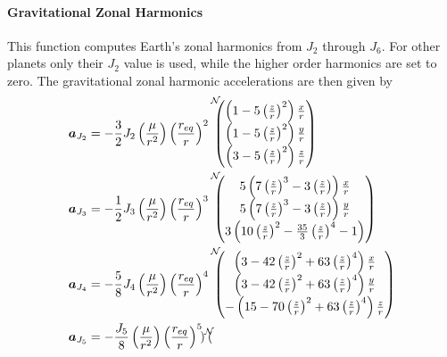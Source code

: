 \paragraph{Gravitational Zonal Harmonics}
This function computes Earth's zonal harmonics from $J_{2}$ through $J_{6}$.  For other planets only their $J_{2}$ value is used, while the higher order harmonics are set to zero.  The gravitational zonal harmonic accelerations are then given by\cite{schaub}
\begin{align}
	\bm a_{J_{2}} &=   -\frac{3}{2} J_{2} 
	\left(\frac{\mu}{r^{2}}\right)
	\left( \frac{r_{eq}}{r}\right)^{2}
	\leftexp{N\!\!\!}{
	\begin{pmatrix}
		\left(1-5\left(\frac{z}{r}\right)^{2}\right) \frac{x}{r} \\
		\left(1-5\left(\frac{z}{r}\right)^{2}\right) \frac{y}{r} \\
		\left(3-5\left(\frac{z}{r}\right)^{2}\right) \frac{z}{r}
	\end{pmatrix}}
	\label{eq:gm:aJ2}
	\\
	\bm a_{J_{3}} &=  -\frac{1}{2} J_{3} 
	\left(\frac{\mu}{r^{2}}\right)
	\left( \frac{r_{eq}}{r}\right)^{3}
	\leftexp{N\!\!\!}{
	\begin{pmatrix}
		5\left(7 \left(\frac{z}{r}\right)^{3} - 3 \left(\frac{z}{r}\right) 
		\right) \frac{x}{r} \\
		5\left(7 \left(\frac{z}{r}\right)^{3} - 3 \left(\frac{z}{r}\right) 
		\right) \frac{y}{r} \\
		3\left(10\left(\frac{z}{r}\right)^{2} - \frac{35}{3} 
		\left(\frac{z}{r}\right)^{4} - 1 \right) 
	\end{pmatrix}}
	\label{eq:gm:aJ3}
	\\
	\bm a_{J_{4}} &=  -\frac{5}{8} J_{4} 
	\left(\frac{\mu}{r^{2}}\right)
	\left( \frac{r_{eq}}{r}\right)^{4}
	\leftexp{N\!\!\!}{
	\begin{pmatrix}
		\left(3-42 \left(\frac{z}{r}\right)^{2} +63 \left(\frac{z}{r}\right)^{4} 
		\right) \frac{x}{r} \\
		\left(3-42 \left(\frac{z}{r}\right)^{2} +63 \left(\frac{z}{r}\right)^{4} 
		\right) \frac{y}{r} \\
		-\left(15-70\left(\frac{z}{r}\right)^{2} + 63 
		\left(\frac{z}{r}\right)^{4}  \right) \frac{z}{r}
	\end{pmatrix}}
	\label{eq:gm:aJ4}
	\\
	\bm a_{J_{5}} &=  -\frac{J_{5}}{8}  
	\left(\frac{\mu}{r^{2}}\right)
	\left( \frac{r_{eq}}{r}\right)^{5}
	\leftexp{N\!\!\!}{
	\begin{pmatrix}

\end{pmatrix}}
\end{align}
